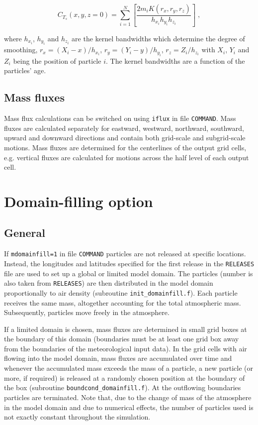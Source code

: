 \documentclass{egu}            %
\begin{document}
\begin{equation}
C_{T_s}(x,y,z=0)=\sum_{i=1}^N \left[ \frac{2m_iK(r_x,r_y,r_z)}{h_{x_i}h_{y_i}h_{z_i}} \right]\;,
\end{equation}

where $h_{x_i}$, $h_{y_i}$ and $h_{z_i}$ are the kernel bandwidths which
determine the degree of smoothing, $r_x=(X_i-x)/h_{x_i}$,
$r_y=(Y_i-y)/h_{y_i}$, $r_z=Z_i/h_{z_i}$ with $X_i$, $Y_i$ and $Z_i$ being the
position of particle $i$.  The kernel bandwidths are a function of the
particles' age.

\subsection{Mass fluxes}

Mass flux calculations can be switched on using \verb|iflux| in file
\verb|COMMAND|.  Mass fluxes are calculated separately for eastward, westward,
northward, southward, upward and downward directions and contain both
grid-scale and subgrid-scale motions.  Mass fluxes are determined for the
centerlines of the output grid cells, e.g.  vertical fluxes are calculated for
motions across the half level of each output cell.

\section{Domain-filling option}

\subsection{General}

If \verb|mdomainfill=1| in file \verb|COMMAND| particles are not released at
specific locations.  Instead, the longitudes and latitudes specified for the
first release in the \verb|RELEASES| file are used to set up a global or
limited model domain.  The particles (number is also taken from
\verb|RELEASES|) are then distributed in the model domain proportionally to air
density (subroutine \verb|init_domainfill.f|).  Each particle receives the same
mass, altogether accounting for the total atmospheric mass.  Subsequently,
particles move freely in the atmosphere.

If a limited domain is chosen, mass fluxes are determined in small grid boxes
at the boundary of this domain (boundaries must be at least one grid box away
from the boundaries of the meteorological input data).  In the grid cells with
air flowing into the model domain, mass fluxes are accumulated over time and
whenever the accumulated mass exceeds the mass of a particle, a new particle
(or more, if required) is released at a randomly chosen position at the
boundary of the box (subroutine \verb|boundcond_domainfill.f|).  At the
outflowing boundaries particles are terminated.  Note that, due to the change
of mass of the atmosphere in the model domain and due to numerical effects, the
number of particles used is not exactly constant throughout the simulation.
\end{document}
